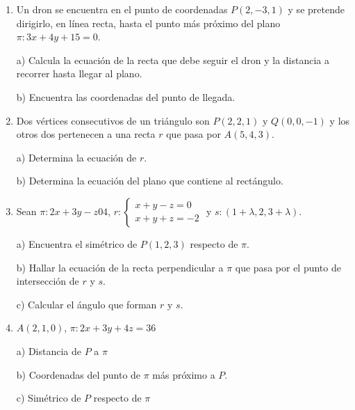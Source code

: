 \begin{enumerate}
\item Un dron se encuentra en el punto de coordenadas $P(2,-3,1)$ y se pretende dirigirlo, en línea recta, hasta el punto más próximo del plano $\pi: 3x+4y+15=0$.

a) Calcula la ecuación de la recta que debe seguir el dron y la distancia a recorrer hasta llegar al plano.

b) Encuentra las coordenadas del punto de llegada.

\vspace{2mm} 

\item Dos vértices consecutivos de un triángulo son $P(2,2,1)$ y $Q(0,0,-1)$ y los otros dos pertenecen a una recta $r$ que pasa por $A(5,4,3)$.

a) Determina la ecuación de $r$.

b) Determina la ecuación del plano que contiene al rectángulo.

\vspace{2mm} 

\item Sean $\pi:2x+3y-z04$, $r:\begin{cases}x+y-z=0\\x+y+z=-2\end{cases}$ y $s: (1+\lambda, 2,3+\lambda)$. 

a) Encuentra el simétrico de $P(1,2,3)$ respecto de $\pi$.

b) Hallar la ecuación de la recta perpendicular a $\pi$ que pasa por el punto de intersección de $r$ y $s$.

c) Calcular el ángulo que forman $r$ y $s$.

\vspace{2mm} 

\item $A(2,1,0)$, $\pi: 2x+3y+4z=36$

a) Distancia de $P$ a $\pi$

b) Coordenadas del punto de $\pi$ más próximo a $P$.

c) Simétrico de $P$ respecto de $\pi$

\vspace{2mm} 


\end{enumerate}

